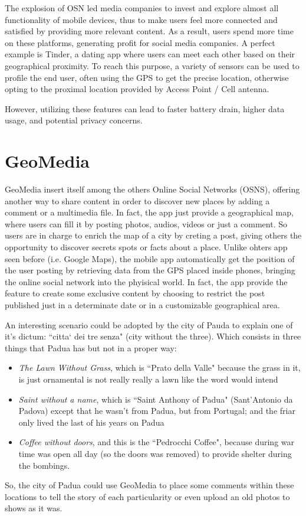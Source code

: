 \documentclass[conference]{IEEEtran}
\begin{document}
The explosion of OSN led media companies to invest and explore almost all functionality of mobile devices, thus to make users feel more connected and satisfied by providing more relevant content. As a result, users spend more time on these platforms, generating profit for social media companies.
A perfect example is Tinder, a dating app where users can meet each other based on their geographical proximity.
To reach this purpose, a variety of sensors can be used to profile the end user, often using the GPS to get the precise location, otherwise opting to the proximal location provided by Access Point / Cell antenna.

However, utilizing these features can lead to faster battery drain, higher data usage, and potential privacy concerns.
\\

\section{GeoMedia}

GeoMedia insert itself among the others Online Social Networks (OSNS), offering another way to share content in order to discover new places by adding a comment or a multimedia file.
In fact, the app just provide a geographical map, where users can fill it by posting photos, audios, videos or just a comment. So users are in charge to enrich the map of a city by creting a post, giving others the opportunity to discover secrets spots or facts about a place.
Unlike ohters app seen before (i.e. Google Maps), the mobile app automatically get the position of the user posting by retrieving data from the GPS placed inside phones, bringing the online social network into the phyisical world. In fact, the app provide the feature to create some exclusive content by choosing to restrict the post published just in a determinate date or in a customizable geographical area.

An interesting scenario could be adopted by the city of Pauda to explain one of it's dictum: ``citta` dei tre senza" (city without the three).
Which consists in three things that Padua has but not in a proper way:
\begin{itemize}
    \item \textit{The Lawn Without Grass}, which is ``Prato della Valle" because the grass in it, is just ornamental is not really really a lawn like the word would intend
    \item \textit{Saint without a name}, which is ``Saint Anthony of Padua" (Sant'Antonio da Padova) except that he wasn't from Padua, but from Portugal; and the friar only lived the last of his years on Padua
    \item \textit{Coffee without doors}, and this is the ``Pedrocchi Coffee", because during war time was open all day (so the doors was removed) to provide shelter during the bombings.
\end{itemize}
So, the city of Padua could use GeoMedia to place some comments within these locations to tell the story of each particularity or even upload an old photos to shows as it was.
\\
\end{document}
